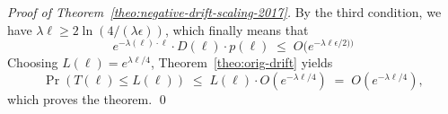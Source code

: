 \documentclass[11pt, a4paper]{article}
\DeclareMathOperator{\Prob}{Pr}
\begin{document}
\begin{proof}[Proof of {Theorem~\ref{theo:negative-drift-scaling-2017}}]
	
	By the third condition, we have  
	$\lambda \ell \ge 2\ln(4/(\lambda \epsilon))$, 
  which finally means that 
  \[
  e^{-\lambda(\ell)\cdot \ell}\cdot D(\ell) \cdot p(\ell) \;\le\; 
  O(e^{-\lambda\ell\epsilon/2 )) } %
  \]
  Choosing
  $L(\ell)=e^{\lambda\ell/4}$, Theorem~\ref{theo:orig-drift} yields
  \[
  \Prob(T(\ell)\le L(\ell)) \;\le\; L(\ell)\cdot O(e^{-\lambda\ell/4}) \;=\;
  O(e^{-\lambda\ell/4}),\]
  which proves the theorem.  \qed\end{proof}
\end{document}
